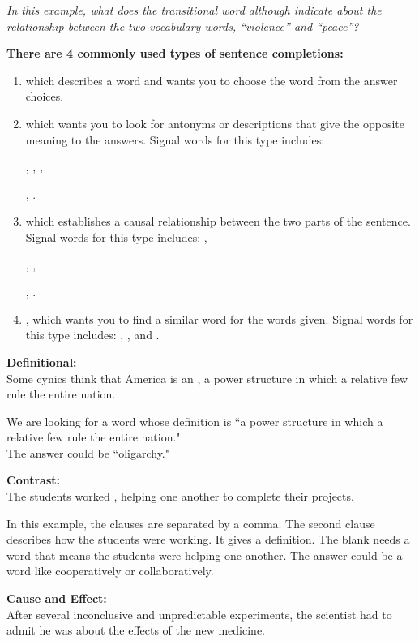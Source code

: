 \bigskip
\textit{In this example, what does the transitional word \textit{although} indicate about the relationship between the two vocabulary words, “violence” and “peace”?}

\textbf{There are 4 commonly used types of sentence completions:}
\begin{enumerate}
\item \longline which describes a word and wants you to choose the word from the answer choices.
\item \longline which wants you to look for antonyms or descriptions that give the opposite meaning to the answers. Signal words for this type includes:

\longline, \longline, \longline,

\longline, \longline.
\item \longline which establishes a causal relationship between the two parts of the sentence. Signal words for this type includes: \longline,

\longline, \longline,

\longline, \longline.
\item \longline, which wants you to find a similar word for the words given. Signal words for this type includes: \longline, \longline, and \longline.
\end{enumerate}

\bigskip
\textbf{Definitional:}\\
Some cynics think that America is an \longline, a power structure in which a relative few rule the entire nation.

\bigskip
We are looking for a word whose definition is ``a power structure in which a relative few rule the entire nation."\\
The answer could be ``oligarchy."

\bigskip
\textbf{Contrast:}\\
The students worked \longline, helping one another to complete their projects.

\bigskip
In this example, the clauses are separated by a comma.  The second clause describes how the students were working.  It gives a definition.  The blank needs a word that means the students were helping one another.  
The answer could be a word like cooperatively or collaboratively.  

\bigskip

\textbf{Cause and Effect:}\\
After several inconclusive and unpredictable experiments, the scientist had to admit he was \longline about the effects of the new medicine.

